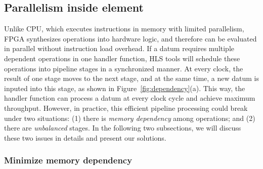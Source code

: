 \subsection{Parallelism inside element}
\label{subsec:paral_in_elem}

%
%
Unlike CPU, which executes instructions in memory with limited parallelism, 
FPGA synthesizes operations into hardware logic, and therefore
can be evaluated in parallel without instruction load overhead.
If a datum requires multiple dependent
operations in one handler function, HLS tools will 
schedule these operations into pipeline stages in a synchronized manner. 
At every clock, the result of one stage moves to the next stage, and 
at the same time, a new datum is inputed into this stage, as shown in
Figure~\ref{fig:dependency}(a).
This way, the handler function can process a datum at every clock cycle
and achieve maximum throughput.
%
However, in practice, this efficient pipeline processing 
could break under two situations: (1) there is \textit{memory dependency} among operations; 
and (2) there are \textit{unbalanced} stages.
%
In the following two subsections, we will discuss these two issues in 
details and present our solutions.



\subsubsection{Minimize memory dependency}

